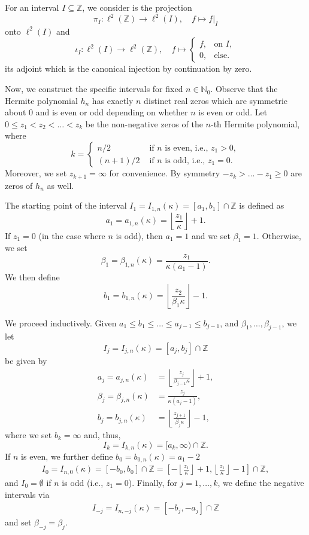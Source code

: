 \documentclass[12pt, reqno]{amsart}
\theoremstyle{definition}
\numberwithin{equation}{section}
\newcommand{\Z}{{\mathbb Z}}
\newcommand{\N}{{\mathbb N}}
\begin{document}
For an interval $I\subseteq \Z$,  we consider is the projection $$\pi_{I}\colon \ell^2(\mathbb{Z})\rightarrow \ell^2(I),\quad f\mapsto f\vert_I$$ onto $\ell^2(I)$ and $$\iota_{I}\colon \ell^2(I)\rightarrow \ell^2(\mathbb{Z}),\quad f\mapsto
\begin{cases}
f, & \mbox{on } I,\\
0, & \mbox{else}.
\end{cases}$$ 
its adjoint  which is the canonical injection by continuation by zero.

Now, we construct the specific intervals for fixed  $n\in \N_0$. Observe that the Hermite polynomial $h_n$ has exactly $n$ distinct real zeros which are symmetric about $0$ and is even or odd depending on whether $n$ is even or odd.
Let $0\leq z_1<z_2<\ldots < z_k$ be the non-negative zeros of the $n$-th Hermite polynomial, where 
$$k=\begin{cases}
n/2  & \text{ if $n$ is even, i.e., $z_1>0$},\\
(n+1)/2 & \text{ if $n$ is odd, i.e., $z_1=0$}.
\end{cases}
$$ 
Moreover, we set $z_{k+1}=\infty$ for convenience. By symmetry $-z_k>\ldots -z_1\ge 0$ are zeros of $h_n$ as well.



The starting point of the interval $I_1=I_{1,n}(\kappa)=[a_1,b_1]\cap \Z$ is defined as
$$ a_1 =a_{1,n}(\kappa)=\left\lfloor{\frac{z_1}{\kappa}}\right\rfloor+1.$$
If  $z_1=0$ (in the case where $n$ is odd), then  $a_1=1$  and we set $\beta_1=1$. Otherwise, we set
$$\beta_1=\beta_{1,n}(\kappa)=\frac{z_1}{\kappa (a_1-1)}. $$
We then define $$b_1=b_{1,n}(\kappa) = \left\lfloor\frac{z_{2}}{\beta_1\kappa}\right\rfloor-1.$$ 


We proceed inductively. Given $a_1\leq b_1\leq \ldots\leq a_{j-1}\leq b_{j-1}$, and
$\beta_1,\ldots,\beta_{j-1}  $, we let $$I_j=I_{j,n}(\kappa)=[a_j,b_j]\cap \Z$$ be given by
\begin{align*}
a_j=a_{j,n}(\kappa) &=\left\lfloor\frac{z_j}{\beta_{j-1}\kappa}\right\rfloor+1,\\
\beta_j=\beta_{j,n}(\kappa) &=\frac{z_j}{\kappa (a_j-1)},\\  
 b_j=b_{j,n}(\kappa) &=\left\lfloor\frac{z_{j+1}}{\beta_j\kappa}\right\rfloor-1,
\end{align*} 
where we set $b_{k}=\infty$ and, thus, $$I_k=I_{k,n}(\kappa)=[a_k,\infty)\cap \Z.$$
If $n$ is even, we further define $b_0=b_{0,n}(\kappa)=a_1-2$
\begin{align*}
    I_0= I_{n,0}(\kappa)=[-b_0,b_0]\cap \Z=
    \left[{-\left\lfloor{\frac{z_1}{\kappa}}\right\rfloor+1 },\left\lfloor{\frac{z_{1}}{\kappa}}\right\rfloor-1  \right] \cap \Z, 
\end{align*}
and $I_0=\emptyset$ if $n$ is odd (i.e., $z_1=0$). Finally, for $j=1,\ldots,k$, we define the negative intervals via
\begin{align*}
    I_{-j}= I_{n,-j}(\kappa)=[-b_j,-a_j]\cap \Z
\end{align*}
and set $\beta_{-j}=\beta_j$.
\end{document}
